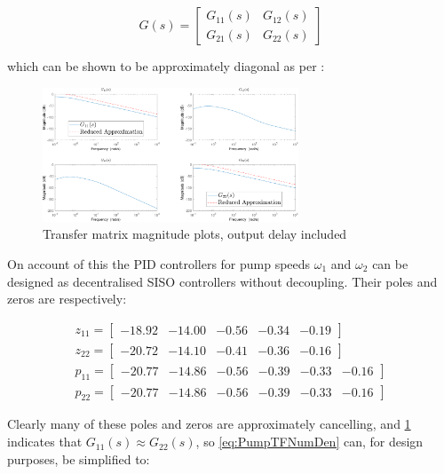 \begin{equation}\label{eq:TransferMatrix}
	G(s) = \begin{bmatrix} G_{11}(s) & G_{12}(s) \\ G_{21}(s) & G_{22}(s)\end{bmatrix}
\end{equation}

which can be shown to be approximately diagonal as per :

\begin{figure}[h!]
 	\centering
 	\includegraphics[width=\linewidth,height=4cm]{Graphics/PumpMagPlot.pdf}
 	\caption{Transfer matrix magnitude plots, output delay included}
 	\label{fig:BodeMagDelayPlot}
\end{figure}

On account of this the PID controllers for pump speeds $\omega_1$ and $\omega_2$ can be designed as decentralised SISO controllers without decoupling. Their poles and zeros are respectively:

\begin{equation}\label{eq:PumpTFNumDen}
	\begin{gathered}
		z_{11} = \begin{bmatrix}-18.92 & -14.00 & -0.56 & -0.34 & -0.19	\end{bmatrix} \\
		z_{22} = \begin{bmatrix}-20.72 & -14.10 & -0.41 & -0.36 & -0.16	\end{bmatrix} \\
		p_{11} = \begin{bmatrix}-20.77 & -14.86 & -0.56 & -0.39 & -0.33 & -0.16\end{bmatrix} \\
		p_{22} = \begin{bmatrix}-20.77 & -14.86 & -0.56 & -0.39 & -0.33 & -0.16\end{bmatrix}
	\end{gathered}
\end{equation}

Clearly many of these poles and zeros are approximately cancelling, and \cref{fig:BodeMagDelayPlot} indicates that $G_{11}(s) \approx G_{22}(s)$, so \cref{eq:PumpTFNumDen} can, for design purposes, be simplified to:

